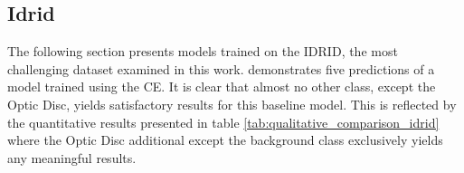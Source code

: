 \subsection{Idrid}

The following section presents models trained on the \ac{IDRID}, the most challenging dataset examined in this work.  demonstrates five predictions of a model trained using the \ac{CE}. It is clear that almost no other class, except the Optic Disc, yields satisfactory results for this baseline model. This is reflected by the quantitative results presented in table \ref{tab:qualitative_comparison_idrid} where the Optic Disc additional except the background class exclusively yields any meaningful results.

\begin{figure}[H]%
  \centering  

\end{figure}
